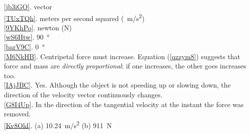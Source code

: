 \documentclass[main-physics.tex]{subfiles}
\begin{document}
\ref{jb3iGO}. vector\\
\ref{TUxTQh}. meters per second squared (\SI{}{m/s^2})\\
\ref{9YKhPo}. newton (N)\\
\ref{wS6Htw}. \SI{90}{\degree}\\
\ref{barV9C}. \SI{0}{\degree}\\
\ref{M6NkHB}. Centripetal force must increase. Equation (\ref{qzzym8}) suggests that force and mass are \textit{directly proportional}: if one increases, the other goes increases too. \\
\ref{IAjJBC}. Yes. Although the object is not speeding up or slowing down, the direction of the velocity vector continuously changes. \\
\ref{G8I4Up}. In the direction of the tangential velocity at the instant the force was removed.\\
\ref{Kv8Old}. (a) \SI{10.24}{m/s^2} \hspace{1em} (b) \SI{911}{N}\\
\end{document}
